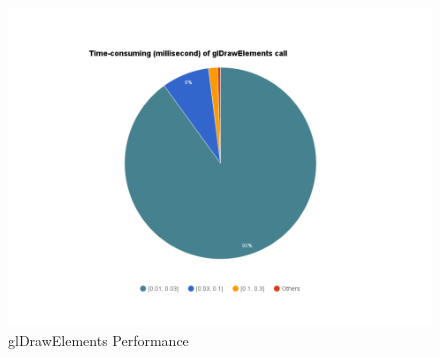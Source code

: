\begin{figure}[H]
	\caption{glDrawElements Performance}
	\label{fig:glDrawElements-performance}
	\centering
	\includegraphics[width=\textwidth, keepaspectratio]{Figures/glDrawElements-performance.png}
	\decoRule
\end{figure}



